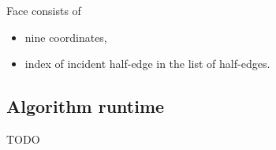 Face consists of
\begin{itemize}
    \setlength\itemsep{-2mm}
    \item nine coordinates,
    \item index of incident half-edge in the list of half-edges.
\end{itemize}

\subsection{Algorithm runtime}
TODO
